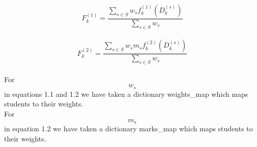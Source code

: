 \documentclass[a4paper,12pt,oneside]{book}
\begin{document}
\begin{equation}
		    F_{k}^{(1)} = \frac{\sum_{s\in S} w_{s} f_{k}^{(1)} (D_{k}^{(s)})}{\sum_{s\in S} w_{s}}
\end{equation}
		\\
\begin{equation}
    F_{k}^{(2)} = \frac{\sum_{s\in S} w_{s} m_{s} f_{k}^{(2)} (D_{k}^{(s)})}{\sum_{s\in S} w_{s}}
\end{equation}
\\
For \begin{equation}w_{s}\end{equation} in equations 1.1 and 1.2 we have taken a dictionary weights\_map which maps students to their weights.\\

For \begin{equation}m_{s}\end{equation} in equation 1.2 we have taken a dictionary marks\_map which maps students to their weights.\\
\end{document}
